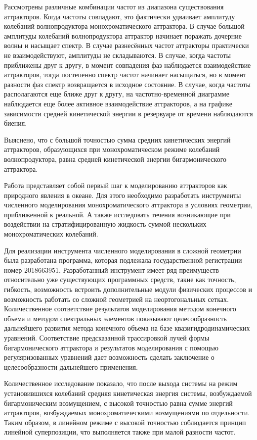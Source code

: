 Рассмотрены различные комбинации частот из диапазона существования аттракторов. Когда частоты совпадают, это фактически удваивает амплитуду колебаний волнопродуктора монохроматического аттрактора. В случае большой амплитуды колебаний волнопродуктора аттрактор начинает поражать дочерние волны и насыщает спектр. В случае разнесённых частот аттракторы практически не взаимодействуют, амплитуды не складываются. В случае, когда частоты приближены друг к другу, в момент совпадения фаз наблюдается взаимодействие аттракторов, тогда постепенно спектр частот начинает насыщаться, но в момент разности фаз спектр возвращается в исходное состояние. В случае, когда частоты располагаются еще ближе друг к другу, на частотно-временной диаграмме наблюдается еще более активное взаимодействие аттракторов, а на графике зависимости средней кинетической энергии в резервуаре от времени наблюдаются биения.


Выяснено, что с большой точностью сумма средних кинетических энергий аттракторов, образующихся при монохроматическом режиме колебаний волнопродуктора, равна средней кинетической энергии бигармонического аттрактора.

Работа представляет собой первый шаг к моделированию аттракторов как природного явления в океане. Для этого необходимо разработать инструменты численного моделирования монохроматического аттрактора в условиях геометрии, приближенной к реальной. А также исследовать течения возникающие при воздействии на стратифицированную жидкость суммой нескольких монохроматических колебаний. 

Для реализации инструмента численного моделирования в сложной геометрии была разработана программа, которая подлежала государственной регистрации номер 2018663951. Разработанный инструмент имеет ряд преимуществ относительно уже существующих программных средств, такие как точность, гибкость, возможность встроить дополнительные модули физических процессов и возможность работать со сложной геометрией на неортогональных сетках. Количественное соответствие результатов моделирования методом конечного объема и методом спектральных элементов показывают целесообразность дальнейшего развития метода конечного объема на базе квазигидродинамических уравнений. Соответствие предсказанной трассировкой лучей формы бигармонического аттрактора и результатов моделирования с помощью регуляризованных уравнений дает возможность сделать заключение о целесообразности дальнейшего применения. 

Количественное исследование показало, что после выхода системы на режим установившихся колебаний средняя кинетическая энергия системы, возбуждаемой бигармоническим возмущением, с высокой точностью равна сумме энергий аттракторов, возбуждаемых монохроматическими возмущениями по отдельности. Таким образом, в линейном режиме с высокой точностью соблюдается принцип линейной суперпозиции, что выполняется также при малой разности частот. 

